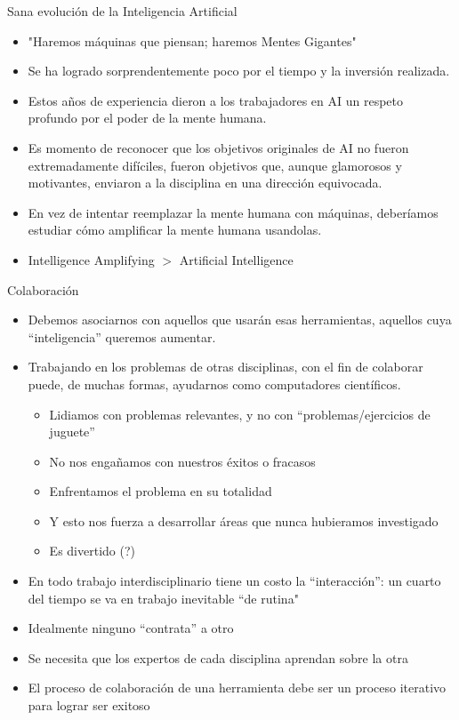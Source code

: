 \documentclass{beamer}
\begin{document}
\begin{frame}{Sana evolución de la Inteligencia Artificial}
\begin{itemize}
\item "Haremos máquinas que piensan; haremos Mentes Gigantes"
\item Se ha logrado sorprendentemente poco por el tiempo y la inversión realizada.
\item Estos años de experiencia dieron a los trabajadores en AI 
un respeto profundo por el poder de la mente humana.
\item Es momento de reconocer que los objetivos originales de AI 
no fueron extremadamente difíciles,
fueron objetivos que, aunque glamorosos y motivantes, 
enviaron a la disciplina en una dirección equivocada.
\item En vez de intentar reemplazar la mente humana con máquinas, 
deberíamos estudiar cómo amplificar la mente humana usandolas.
\item Intelligence Amplifying $>$ Artificial Intelligence
\end{itemize}
\end{frame}

\begin{frame}{Colaboración}
\begin{itemize}
\item Debemos asociarnos con aquellos que usarán esas herramientas, aquellos cuya ``inteligencia'' queremos aumentar.
\item Trabajando en los problemas de otras disciplinas, con el fin de colaborar puede, de muchas formas, ayudarnos como computadores científicos.
	\begin{itemize}
	\item Lidiamos con problemas relevantes, y no con ``problemas/ejercicios de juguete''
	\item No nos engañamos con nuestros éxitos o fracasos
	\item Enfrentamos el problema en su totalidad
	\item Y esto nos fuerza a desarrollar áreas que nunca hubieramos investigado
	\item Es divertido (?)
	\end{itemize}
\item En todo trabajo interdisciplinario tiene un costo la ``interacción'': un cuarto del tiempo se va en trabajo inevitable ``de rutina"
\item Idealmente ninguno ``contrata'' a otro
\item Se necesita que los expertos de cada disciplina aprendan sobre la otra
\item El proceso de colaboración de una herramienta debe ser un proceso iterativo para lograr ser exitoso

\end{itemize}
\end{frame}
\end{document}
